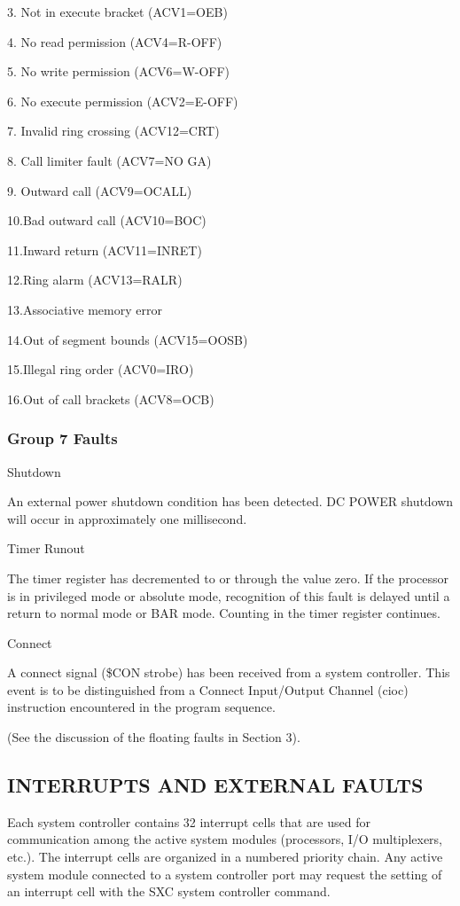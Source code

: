 3. Not in execute bracket (ACV1=OEB)

4. No read permission (ACV4=R-OFF)

5. No write permission (ACV6=W-OFF)

6. No execute permission (ACV2=E-OFF)

7. Invalid ring crossing (ACV12=CRT)

8. Call limiter fault (ACV7=NO GA)

9. Outward call (ACV9=OCALL)

10.Bad outward call (ACV10=BOC)

11.Inward return (ACV11=INRET)

12.Ring alarm (ACV13=RALR)

13.Associative memory error

14.Out of segment bounds (ACV15=OOSB)

15.Illegal ring order (ACV0=IRO)

16.Out of call brackets (ACV8=OCB)

\subsubsection{Group 7 Faults}

Shutdown

An external power shutdown condition has been detected. DC POWER shutdown will 
occur in approximately one millisecond.

Timer Runout

The timer register has decremented to or through the value zero. If the
processor is in privileged mode or absolute mode, recognition of this fault is
delayed until a return to normal mode or BAR mode. Counting in the timer
register continues.  

Connect

A connect signal (\$CON strobe) has been received from a system controller.
This event is to be distinguished from a Connect Input/Output Channel (cioc)
instruction encountered in the program sequence.

(See the discussion of the floating faults in Section 3).

\subsection{INTERRUPTS AND EXTERNAL FAULTS}

Each system controller contains 32 interrupt cells that are used for
communication among the active system modules (processors, I/O multiplexers,
etc.). The interrupt cells are organized in a numbered priority chain. Any
active system module connected to a system controller port may request the
setting of an interrupt cell with the SXC system controller command.  

